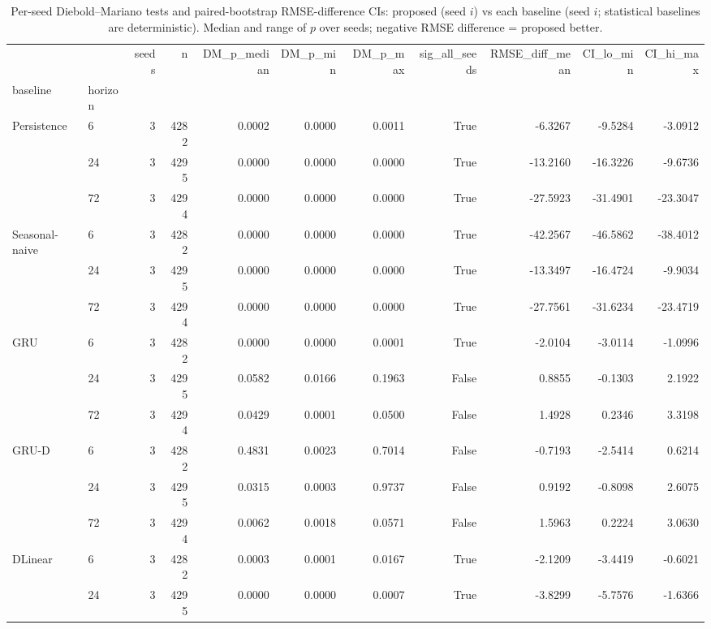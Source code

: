 \begin{table}
\caption{Per-seed Diebold--Mariano tests and paired-bootstrap RMSE-difference CIs: proposed (seed $i$) vs each baseline (seed $i$; statistical baselines are deterministic). Median and range of $p$ over seeds; negative RMSE difference = proposed better.}
\label{tab:significance}
\begin{tabular}{llrrrrrrrrr}
\toprule
 &  & seeds & n & DM\_p\_median & DM\_p\_min & DM\_p\_max & sig\_all\_seeds & RMSE\_diff\_mean & CI\_lo\_min & CI\_hi\_max \\
baseline & horizon &  &  &  &  &  &  &  &  &  \\
\midrule
\multirow[t]{3}{*}{Persistence} & 6 & 3 & 4282 & 0.0002 & 0.0000 & 0.0011 & True & -6.3267 & -9.5284 & -3.0912 \\
 & 24 & 3 & 4295 & 0.0000 & 0.0000 & 0.0000 & True & -13.2160 & -16.3226 & -9.6736 \\
 & 72 & 3 & 4294 & 0.0000 & 0.0000 & 0.0000 & True & -27.5923 & -31.4901 & -23.3047 \\
\cline{1-11}
\multirow[t]{3}{*}{Seasonal-naive} & 6 & 3 & 4282 & 0.0000 & 0.0000 & 0.0000 & True & -42.2567 & -46.5862 & -38.4012 \\
 & 24 & 3 & 4295 & 0.0000 & 0.0000 & 0.0000 & True & -13.3497 & -16.4724 & -9.9034 \\
 & 72 & 3 & 4294 & 0.0000 & 0.0000 & 0.0000 & True & -27.7561 & -31.6234 & -23.4719 \\
\cline{1-11}
\multirow[t]{3}{*}{GRU} & 6 & 3 & 4282 & 0.0000 & 0.0000 & 0.0001 & True & -2.0104 & -3.0114 & -1.0996 \\
 & 24 & 3 & 4295 & 0.0582 & 0.0166 & 0.1963 & False & 0.8855 & -0.1303 & 2.1922 \\
 & 72 & 3 & 4294 & 0.0429 & 0.0001 & 0.0500 & False & 1.4928 & 0.2346 & 3.3198 \\
\cline{1-11}
\multirow[t]{3}{*}{GRU-D} & 6 & 3 & 4282 & 0.4831 & 0.0023 & 0.7014 & False & -0.7193 & -2.5414 & 0.6214 \\
 & 24 & 3 & 4295 & 0.0315 & 0.0003 & 0.9737 & False & 0.9192 & -0.8098 & 2.6075 \\
 & 72 & 3 & 4294 & 0.0062 & 0.0018 & 0.0571 & False & 1.5963 & 0.2224 & 3.0630 \\
\cline{1-11}
\multirow[t]{3}{*}{DLinear} & 6 & 3 & 4282 & 0.0003 & 0.0001 & 0.0167 & True & -2.1209 & -3.4419 & -0.6021 \\
 & 24 & 3 & 4295 & 0.0000 & 0.0000 & 0.0007 & True & -3.8299 & -5.7576 & -1.6366 \\

\end{tabular}
\end{table}
